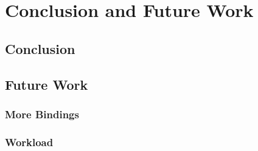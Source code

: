 
\chapter{Conclusion and Future Work}
\label{ch:FutureWork}
%

\section{Conclusion}

\section{Future Work}

\subsection{More Bindings}

\subsection{Workload}
